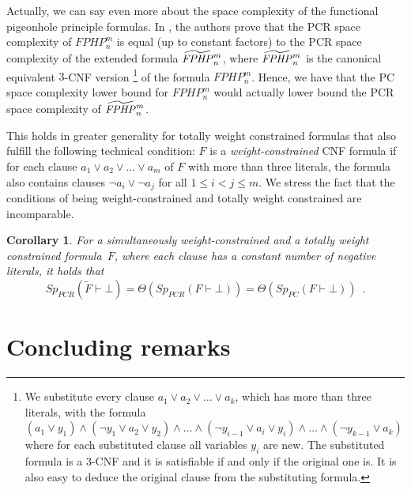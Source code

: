 \documentclass[11pt]{article}
\numberwithin{equation}{section}
\newtheorem{corollary}[theorem]{Corollary}
\theoremstyle{definition}
\theoremstyle{plain}
\theoremstyle{plain}
\theoremstyle{definition}
\newcommand{\bigtheta}[1]{\Theta ( #1 )}
\newcommand{\eqperiod}{\enspace .}
\newcommand{\lita}{\ensuremath{a}}
\newcommand{\derivabbrevsmall}[2]{( #1 \vdash #2 )}
\newcommand{\refutabbrevsmall}[1]{\derivabbrevsmall{#1}{\!\bot}}
\newcommand{\genericrefsmall}[3]{{\mathit{#1}}_{#2}\refutabbrevsmall{#3}}
\newcommand{\mspaceref}[2][]{\genericrefsmall{Sp}{#1}{#2}}
\newcommand{\formulaformat}[1]{\mathit{#1}}
\newcommand{\extendedversion}[1]{\widetilde{#1}}
\newcommand{\fphpnot}[2]{\formulaformat{FPHP}^{#1}_{#2}}
\newcommand{\efphpnot}[2]{\vphantom{\extendedversion{\formulaformat{FPHP}}}
      {\smash{\extendedversion{\formulaformat{FPHP}}}
        \vphantom{\formulaformat{FPHP}}}^{#1}_{#2}}
\newcommand{\varweightconstrained}{totally weight constrained\xspace}
\begin{document}
%
%
%
%
%
%
%

Actually, we can say even more about the space complexity of the
functional pigeonhole principle formulas. In \cite{FLNRT15SpaceCplx},
the authors prove that the PCR space complexity of $\fphpnot{m}{n}$ is
equal (up to constant factors) to the PCR space complexity of the
extended formula $\efphpnot{m}{n}$, where $\efphpnot{m}{n}$ is the
canonical equivalent $3$-CNF version%
%
\footnote{We substitute every clause $\lita_{1}\lor\lita_{2}\lor \ldots \lor
  \lita_{k}$, which has more than three literals, with the formula
$(\lita_{1}\lor y_{1}) \land
(\lnot{y_{1}}\lor\lita_{2}\lor y_{2})
\land \ldots \land
(\lnot{y_{i-1}}\lor\lita_{i}\lor y_{i})
\land \ldots \land
(\lnot{y_{k-1}}\lor\lita_{k}) $
%
where for each substituted clause all variables $y_{i}$ are new. The
substituted formula is a $3$-CNF and it is satisfiable if and only if
the original one is. It is also easy to deduce the original clause
from the substituting formula.}
%
of the formula $\fphpnot{m}{n}$. Hence, we have that the PC
space complexity lower bound for $\fphpnot{m}{n}$ would actually lower
bound the PCR space complexity of $\efphpnot{m}{n}$.

This holds in greater generality for \varweightconstrained{} formulas
that also fulfill the following technical condition: $F$ is a
\emph{weight-constrained} CNF formula if for each clause $\lita_{1} \lor
\lita_{2} \lor \ldots \lor \lita_{m}$ of $F$ with more than three literals,
the formula also contains clauses $\lnot{\lita_{i}} \lor \lnot{\lita_{j}}$ for
all $1 \leq i < j \leq m$.
%
We stress the fact that the conditions of being weight-constrained and \varweightconstrained{} are incomparable.

\begin{corollary}
  For a simultaneously weight-constrained and a
  \varweightconstrained{} formula~$F$, where each clause has a constant
  number of negative literals, it holds that
  \begin{equation*}
    \mspaceref[PCR]{\extendedversion{F}} = \bigtheta{\mspaceref[PCR]{F}} = \bigtheta{\mspaceref[PC]{F}} \eqperiod
  \end{equation*}
\end{corollary}
 
%

\section{Concluding remarks}
\label{sec:concluding-remarks}
\end{document}
